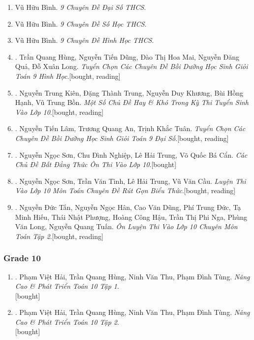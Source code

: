 \documentclass{article}
\begin{document}
\begin{enumerate}
	\item Vũ Hữu Bình. \textit{9 Chuyên Đề Đại Số THCS}.
	\item Vũ Hữu Bình. \textit{9 Chuyên Đề Số Học THCS}.
	\item Vũ Hữu Bình. \textit{9 Chuyên Đề Hình Học THCS}.
	\item \cite{Hung_Dung_Mai_Qua_Long_Toan_9_hinh_hoc}. Trần Quang Hùng, Nguyễn Tiến Dũng, Đào Thị Hoa Mai, Nguyễn Đăng Quả, Đỗ Xuân Long. \textit{Tuyển Chọn Các Chuyên Đề Bồi Dưỡng Học Sinh Giỏi Toán 9 Hình Học}.\hfill\textsf{[bought, reading]}
	\item \cite{Kien_Trung_Khuong_Hanh_Bon}. Nguyễn Trung Kiên, Đặng Thành Trung, Nguyễn Duy Khương, Bùi Hồng Hạnh, Vũ Trung Bồn. \textit{Một Số Chủ Đề Hay \& Khó Trong Kỳ Thi Tuyển Sinh Vào Lớp 10}.\hfill\textsf{[bought, reading]}
	\item \cite{Lam_An_Tuan_Toan_9_dai_so}. Nguyễn Tiến Lâm, Trương Quang An, Trịnh Khắc Tuân. \textit{Tuyển Chọn Các Chuyên Đề Bồi Dưỡng Học Sinh Giỏi Toán 9 Đại Số}.\hfill\textsf{[bought, reading]}
	\item \cite{Son_Nghiep_Trung_Can_bdt}. Nguyễn Ngọc Sơn, Chu Đình Nghiệp, Lê Hải Trung, Võ Quốc Bá Cẩn. \textit{Các Chủ Đề Bất Đẳng Thức Ôn Thi Vào Lớp 10}.\hfill\textsf{[bought]}
	\item \cite{Son_Tinh_Trung_Cau_rgbt}. Nguyễn Ngọc Sơn, Trần Văn Tình, Lê Hải Trung, Vũ Văn Cầu. \textit{Luyện Thi Vào Lớp 10 Môn Toán Chuyên Đề Rút Gọn Biểu Thức}.\hfill\textsf{[bought, reading]}
	\item \cite{Tan_Han_Dung_Duc_Hieu_Phuong_Hau_Nga_Long_Tuan_tap_2}. Nguyễn Đức Tấn, Nguyễn Ngọc Hân, Cao Văn Dũng, Phí Trung Đức, Tạ Minh Hiếu, Thái Nhật Phượng, Hoàng Công Hậu, Trần Thị Phi Nga, Phùng Văn Long, Nguyễn Quang Tuấn. \textit{Ôn Luyện Thi Vào Lớp 10 Chuyên Môn Toán Tập 2}.\hfill\textsf{[bought, reading]}
\end{enumerate}

\subsubsection{Grade 10}

\begin{enumerate}
	\item \cite{Hai_Hung_Thu_Tung2022_tap_1}. Phạm Việt Hải, Trần Quang Hùng, Ninh Văn Thu, Phạm Đình Tùng. \textit{Nâng Cao \& Phát Triển Toán 10 Tập 1}.\\\mbox{}\hfill\textsf{[bought]}
	\item \cite{Hai_Hung_Thu_Tung2022_tap_2}. Phạm Việt Hải, Trần Quang Hùng, Ninh Văn Thu, Phạm Đình Tùng. \textit{Nâng Cao \& Phát Triển Toán 10 Tập 2}.\\\mbox{}\hfill\textsf{[bought]}
\end{enumerate}
\end{document}
